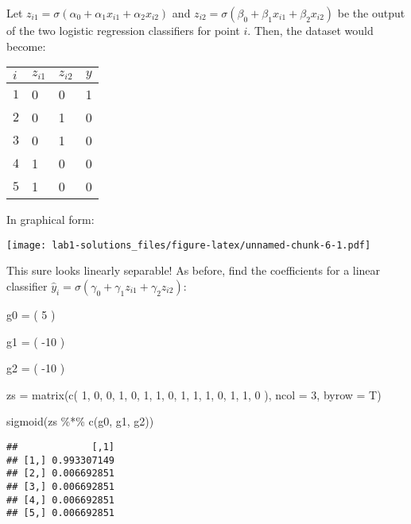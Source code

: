 \documentclass[
]{article}
\newenvironment{Shaded}{\begin{snugshade}}{\end{snugshade}}
\newcommand{\AttributeTok}[1]{\textcolor[rgb]{0.77,0.63,0.00}{#1}}
\newcommand{\DecValTok}[1]{\textcolor[rgb]{0.00,0.00,0.81}{#1}}
\newcommand{\FunctionTok}[1]{\textcolor[rgb]{0.00,0.00,0.00}{#1}}
\newcommand{\NormalTok}[1]{#1}
\newcommand{\OtherTok}[1]{\textcolor[rgb]{0.56,0.35,0.01}{#1}}
\newcommand{\SpecialCharTok}[1]{\textcolor[rgb]{0.00,0.00,0.00}{#1}}
\begin{document}
Let \(z_{i1}=\sigma(\alpha_0+\alpha_1x_{i1}+\alpha_2x_{i2})\) and
\(z_{i2}=\sigma(\beta_0+\beta_1x_{i1}+\beta_2x_{i2})\) be the output of
the two logistic regression classifiers for point \(i\). Then, the
dataset would become:

\begin{longtable}[]{@{}llll@{}}
\toprule
\(i\) & \(z_{i1}\) & \(z_{i2}\) & \(y\)\tabularnewline
\midrule
\endhead
\(1\) & 0 & 0 & 1\tabularnewline
\(2\) & 0 & 1 & 0\tabularnewline
\(3\) & 0 & 1 & 0\tabularnewline
\(4\) & 1 & 0 & 0\tabularnewline
\(5\) & 1 & 0 & 0\tabularnewline
\bottomrule
\end{longtable}

In graphical form:

\texttt{[image: lab1-solutions\_files/figure-latex/unnamed-chunk-6-1.pdf]}

This sure looks linearly separable! As before, find the coefficients for
a linear classifier
\(\hat{y}_i=\sigma\left(\gamma_0+\gamma_1z_{i1}+\gamma_2z_{i2}\right)\):

\begin{Shaded}
\begin{Highlighting}[]
\NormalTok{g0 }\OtherTok{=}\NormalTok{ (}
  \DecValTok{5}
\NormalTok{)}

\NormalTok{g1 }\OtherTok{=}\NormalTok{ (}
  \SpecialCharTok{{-}}\DecValTok{10}
\NormalTok{)}

\NormalTok{g2 }\OtherTok{=}\NormalTok{ (}
  \SpecialCharTok{{-}}\DecValTok{10}
\NormalTok{)}

\NormalTok{zs }\OtherTok{=} \FunctionTok{matrix}\NormalTok{(}\FunctionTok{c}\NormalTok{(}
  \DecValTok{1}\NormalTok{, }\DecValTok{0}\NormalTok{, }\DecValTok{0}\NormalTok{,}
  \DecValTok{1}\NormalTok{, }\DecValTok{0}\NormalTok{, }\DecValTok{1}\NormalTok{,}
  \DecValTok{1}\NormalTok{, }\DecValTok{0}\NormalTok{, }\DecValTok{1}\NormalTok{,}
  \DecValTok{1}\NormalTok{, }\DecValTok{1}\NormalTok{, }\DecValTok{0}\NormalTok{,}
  \DecValTok{1}\NormalTok{, }\DecValTok{1}\NormalTok{, }\DecValTok{0}
\NormalTok{), }\AttributeTok{ncol =} \DecValTok{3}\NormalTok{, }\AttributeTok{byrow =}\NormalTok{ T)}

\FunctionTok{sigmoid}\NormalTok{(zs }\SpecialCharTok{\%*\%} \FunctionTok{c}\NormalTok{(g0, g1, g2))}
\end{Highlighting}
\end{Shaded}

\begin{verbatim}
##             [,1]
## [1,] 0.993307149
## [2,] 0.006692851
## [3,] 0.006692851
## [4,] 0.006692851
## [5,] 0.006692851
\end{verbatim}
\end{document}
